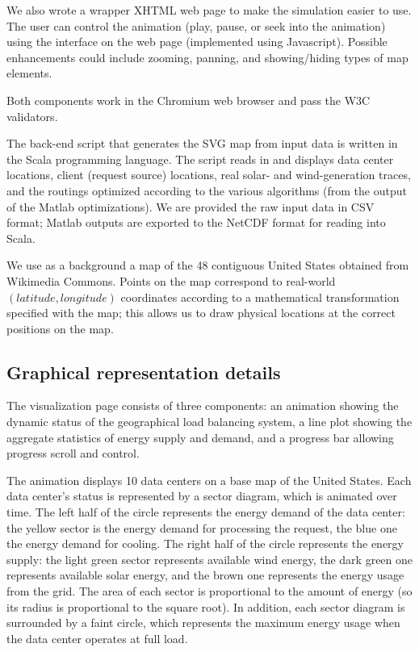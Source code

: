 \documentclass{acm_proc_article-sp}
\begin{document}
We also wrote a wrapper XHTML web page to make the simulation easier to use. The user can control the animation (play, pause, or seek into the animation) using the interface on the web page (implemented using Javascript). Possible enhancements could include zooming, panning, and showing/hiding types of map elements.

Both components work in the Chromium web browser and pass the W3C validators.

The back-end script that generates the SVG map from input data is written in the Scala programming language. The script reads in and displays data center locations, client (request source) locations, real solar- and wind-generation traces, and the routings optimized according to the various algorithms (from the output of the Matlab optimizations). We are provided the raw input data in CSV format; Matlab outputs are exported to the NetCDF format for reading into Scala.

We use as a background a map \cite{wikimap} of the 48 contiguous United States obtained from Wikimedia Commons. Points on the map correspond to real-world $(latitude, longitude)$ coordinates according to a mathematical transformation specified with the map; this allows us to draw physical locations at the correct positions on the map.

\subsection{Graphical representation details}
The visualization page consists of three components: an animation showing the dynamic status of the geographical load balancing system, a line plot showing the aggregate statistics of energy supply and demand, and a progress bar allowing progress scroll and control.

The animation displays 10 data centers on a base map of the United States. Each data center's status is represented by a sector diagram, which is animated over time. The left half of the circle represents the energy demand of the data center: the yellow sector is the energy demand for processing the request, the blue one the energy demand for cooling. The right half of the circle represents the energy supply: the light green sector represents available wind energy, the dark green one represents available solar energy, and the brown one represents the energy usage from the grid. The area of each sector is proportional to the amount of energy (so its radius is proportional to the square root). In addition, each sector diagram is surrounded by a faint circle, which represents the maximum energy usage when the data center operates at full load.
\end{document}
